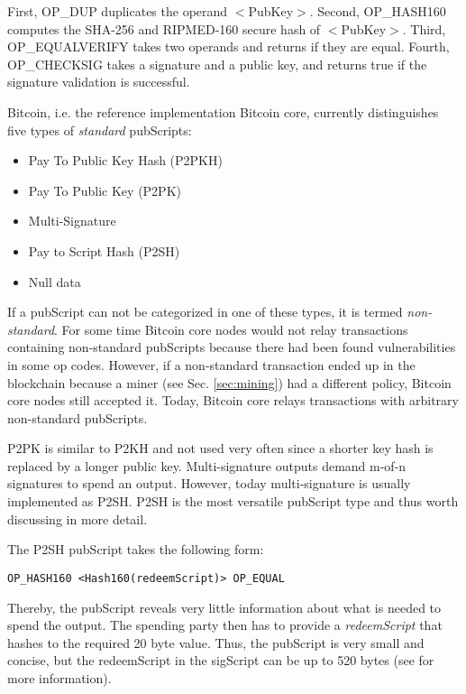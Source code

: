 First, OP\_DUP duplicates the operand $<$PubKey$>$. Second, OP\_HASH160 computes the SHA-256 and RIPMED-160 secure hash of $<$PubKey$>$. Third, OP\_EQUALVERIFY takes two operands and returns if they are equal. Fourth, OP\_CHECKSIG takes a signature and a public key, and returns true if the signature validation is successful. 

Bitcoin, i.e. the reference implementation Bitcoin core, currently distinguishes five types of \emph{standard} pubScripts:

\begin{itemize}
\item Pay To Public Key Hash (P2PKH)
\item Pay To Public Key (P2PK)
\item Multi-Signature 
\item Pay to Script Hash (P2SH)
\item Null data
\end{itemize}

If a pubScript can not be categorized in one of these types, it is termed \emph{non-standard}. For some time Bitcoin core nodes would not relay transactions containing non-standard pubScripts because there had been found vulnerabilities in some op codes. However, if a non-standard transaction ended up in the blockchain because a miner  (see Sec. \ref{sec:mining}) had a different policy, Bitcoin core nodes still accepted it. Today, Bitcoin core relays transactions with arbitrary non-standard pubScripts.

P2PK is similar to P2KH and not used very often since a shorter key hash is replaced by a longer public key. Multi-signature outputs demand m-of-n signatures to spend an output. However, today multi-signature is usually implemented as P2SH. P2SH is the most versatile pubScript type and thus worth discussing in more detail.

The P2SH pubScript takes the following form:

\begin{lstlisting}
OP_HASH160 <Hash160(redeemScript)> OP_EQUAL
\end{lstlisting}

Thereby, the pubScript reveals very little information about what is needed to spend the output. The spending party then has to provide a \emph{redeemScript} that hashes to the required 20 byte value. Thus, the pubScript is very small and concise, but the redeemScript in the sigScript can be up to 520 bytes (see \cite{bip16} for more information). 

